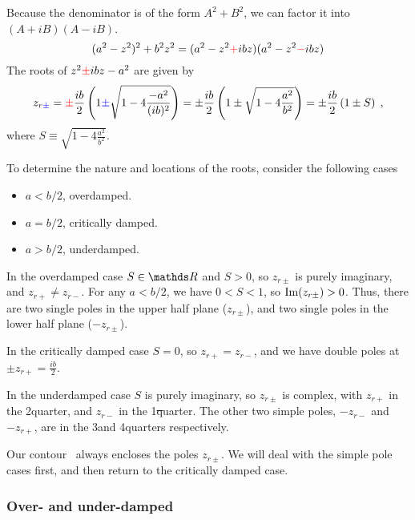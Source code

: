 Because the denominator is of the form $A^2 + B^2$, we can factor it
into $(A+iB)(A-iB)$. %
\begin{equation}
  (a^2-z^2)^2 + b^2 z^2
      = (a^2-z^2 \textcolor{red}{+} ibz)(a^2-z^2 \textcolor{red}{-} ibz)
\end{equation}
The roots of $z^2 \textcolor{red}{\pm} ibz - a^2$ are given by
\begin{equation}
  z_{r\textcolor{blue}{\pm}}
       = \textcolor{red}{\pm}\frac{ib}{2} \left(
                       1 \textcolor{blue}{\pm} \sqrt{1-4\frac{-a^2}{(ib)^2}}
                                 \right)
       = \pm\frac{ib}{2} \left(
                       1 \pm \sqrt{1-4\frac{a^2}{b^2}}
                          \right)
       = \pm\frac{ib}{2} \left(
                       1 \pm S
                          \right) \;,
\end{equation}
where $S \equiv \sqrt{1-4\frac{a^2}{b^2}}$.

To determine the nature and locations of the roots, consider the following
cases
\begin{itemize}
 \item $a < b/2$, overdamped.
 \item $a = b/2$, critically damped.
 \item $a > b/2$, underdamped.
\end{itemize}

In the overdamped case $S \in \Reals$ and $S > 0$,
so $z_{r\pm}$ is purely imaginary, and $z_{r+} \ne z_{r-}$.
For any $a < b/2$, we have $0 < S < 1$, so $\operatorname{Im}(z_{r\pm}) > 0$.
Thus, there are two single poles in the upper half plane ($z_{r\pm}$),
and two single poles in the lower half plane ($-z_{r\pm}$).

In the critically damped case $S = 0$, so $z_{r+} = z_{r-}$,
and we have double poles at $\pm z_{r+} = \frac{ib}{2}$.

In the underdamped case $S$ is purely imaginary, 
so $z_{r\pm}$ is complex, with $z_{r+}$ in the 2\nd quarter,
and $z_{r-}$ in the 1\st quarter.
The other two simple poles, $-z_{r-}$ and $-z_{r+}$, are in the
3\rd and 4\sth quarters respectively.

Our contour \C\ always encloses the poles $z_{r\pm}$.
We will deal with the simple pole cases first, 
and then return to the critically damped case.

\subsubsection{Over- and under-damped}


